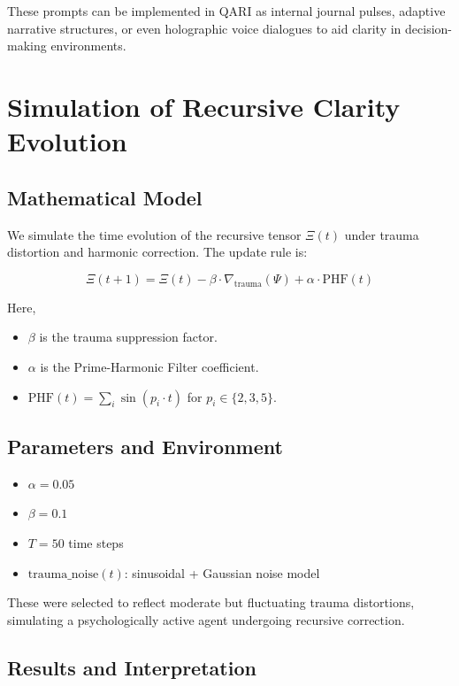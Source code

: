 \documentclass[12pt]{article}
\begin{document}
These prompts can be implemented in QARI as internal journal pulses, adaptive narrative structures, or even holographic voice dialogues to aid clarity in decision-making environments.

\section{Simulation of Recursive Clarity Evolution}

\subsection{Mathematical Model}

We simulate the time evolution of the recursive tensor $\Xi(t)$ under trauma distortion and harmonic correction. The update rule is:

\begin{equation}
\Xi(t+1) = \Xi(t) - \beta \cdot \nabla_{\text{trauma}}(\Psi) + \alpha \cdot \text{PHF}(t)
\end{equation}

Here,
\begin{itemize}
    \item $\beta$ is the trauma suppression factor.
    \item $\alpha$ is the Prime-Harmonic Filter coefficient.
    \item $\text{PHF}(t) = \sum_{i} \sin(p_i \cdot t)$ for $p_i \in \{2, 3, 5\}$.
\end{itemize}

\subsection{Parameters and Environment}

\begin{itemize}
    \item $\alpha = 0.05$
    \item $\beta = 0.1$
    \item $T = 50$ time steps
    \item $\text{trauma\_noise}(t)$: sinusoidal + Gaussian noise model
\end{itemize}

These were selected to reflect moderate but fluctuating trauma distortions, simulating a psychologically active agent undergoing recursive correction.

\subsection{Results and Interpretation}
\end{document}
